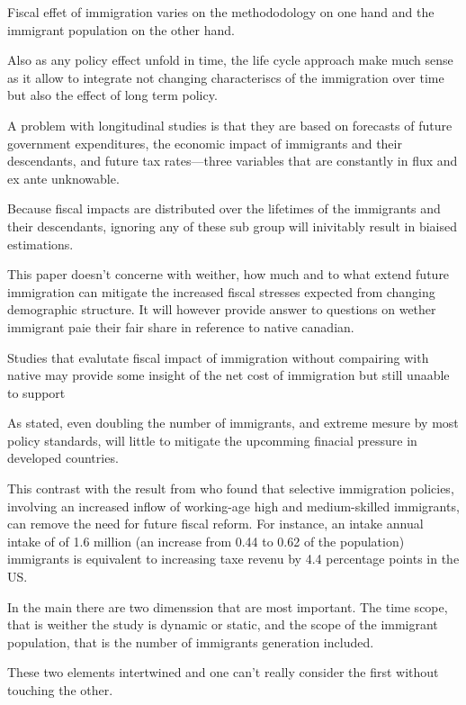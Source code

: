   Fiscal effet of immigration varies on the methododology on one hand and the immigrant population on the other hand. \citep{Chojnicki:2011vu,Lee:1998fs}

  Also as any policy effect unfold in time, the life cycle approach make much sense as it allow to integrate not changing characteriscs of the immigration over time but also the effect of long term policy.

  A problem with longitudinal studies is that they are based on forecasts of future government expenditures, the economic impact of immigrants and their descendants, and future tax rates—three variables that are constantly in flux and ex ante unknowable.


  Because fiscal impacts are distributed over the lifetimes of the immigrants and their descendants, ignoring any of these sub group will inivitably result in biaised estimations.




  This paper doesn't concerne with weither, how much and to what extend future immigration can mitigate the increased fiscal stresses expected from changing demographic structure. It will however provide answer to questions on wether immigrant paie their fair share in reference to native canadian.

  Studies that evalutate fiscal impact of immigration without compairing with native may provide some insight of the net cost of immigration but still unaable to support

  As \citep{Fehr:2003gq} stated, even doubling the number of immigrants, and extreme mesure by most policy standards, will little to mitigate the upcomming finacial pressure in developed countries.

  This contrast with the result from \citep{Storesletten:2000cn} who found that selective immigration policies, involving an increased inflow of working-age high and medium-skilled immigrants, can remove the need for future fiscal reform. For instance, an intake annual intake of of 1.6 million (an increase from 0.44 to 0.62 of the population) immigrants is equivalent to increasing taxe revenu by 4.4 percentage points in the US.


  In the main there are two dimenssion that are most important. The time scope, that is weither the study is dynamic or static, and the scope of the immigrant population, that is the number of immigrants generation included.

  These two elements intertwined and one can't really consider the first without touching the other.



